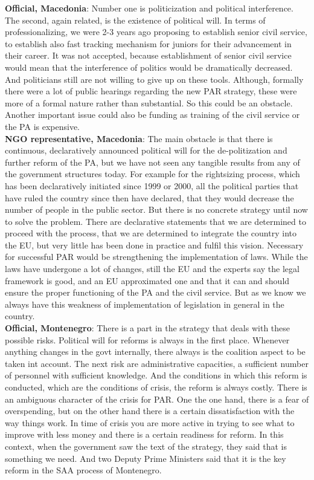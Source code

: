 \textbf{Official, Macedonia}: Number one is politicization and political interference. The second, again related, is the existence of political will. In terms of professionalizing, we were 2-3 years ago proposing to establish senior civil service, to establish also fast tracking mechanism for juniors for their advancement in their career. It was not accepted, because establishment of senior civil service would mean that the interference of politics would be dramatically decreased. And politicians still are not willing to give up on these tools. Although, formally there were a lot of public hearings regarding the new PAR strategy, these were more of a formal nature rather than substantial. So this could be an obstacle. Another important issue could also be funding as training of the civil service or the PA is expensive. \\
\textbf{NGO representative,  Macedonia}: The main obstacle is that there is continuous, declaratively announced political will for the de-politization and further reform of the PA, but we have not seen any tangible results from any of the government structures today. For example for the rightsizing process, which has been declaratively initiated since 1999 or 2000, all the political parties that have ruled the country since then have declared, that they would decrease the number of people in the public sector. But there is no concrete strategy until now to solve the problem. There are declarative statements that we are determined to proceed with the process, that we are determined to integrate the country into the EU, but very little has been done in practice and fulfil this vision. Necessary for successful PAR would be strengthening the implementation of laws. While the laws have undergone a lot of changes, still the EU and the experts say the legal framework is good, and an EU approximated one and that it can and should ensure the proper functioning of the PA and the civil service. But as we know we always have this weakness of implementation of legislation in general in the country. \\
\textbf{Official, Montenegro}: There is a part in the strategy that deals with these possible risks. Political will for reforms is always in the first place. Whenever anything changes in the govt internally, there always is the coalition aspect to be taken int account. The next risk are administrative capacities, a sufficient number of personnel with sufficient knowledge. And the conditions in which this reform is conducted, which are the conditions of crisis, the reform is always costly. There is an ambiguous character of the crisis for PAR. One the one hand, there is a fear of overspending, but on the other hand there is a certain dissatisfaction with the way things work. In time of crisis you are more active in trying to see what to improve with less money and there is a certain readiness for reform. In this context, when the government saw the text of the strategy, they said that is something we need. And two Deputy Prime Ministers said that it is the key reform in the SAA process of Montenegro. \\
